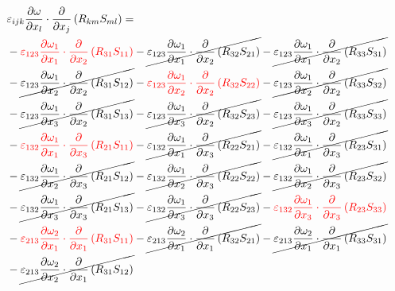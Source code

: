 \begin{equation}
	\begin{split}
		 & \varepsilon_{ijk}\pdv{\omega}{x_{l}} \cdot\pdv{}{x_{j}}\left(R_{km}S_{ml}\right) =  \\ 
		&-{\color{red}\varepsilon_{123}\pdv{\omega_{1}}{x_{1}}\cdot\pdv{}{x_{2}}\left(R_{31}S_{11}\right)
}		-\cancel{\varepsilon_{123}\pdv{\omega_{1}}{x_{1}}\cdot\pdv{}{x_{2}}\left(R_{32}S_{21}\right)
}		-\cancel{\varepsilon_{123}\pdv{\omega_{1}}{x_{1}}\cdot\pdv{}{x_{2}}\left(R_{33}S_{31}\right)
}\\ 
		&-\cancel{\varepsilon_{123}\pdv{\omega_{1}}{x_{2}}\cdot\pdv{}{x_{2}}\left(R_{31}S_{12}\right)
}		-{\color{red}\varepsilon_{123}\pdv{\omega_{1}}{x_{2}}\cdot\pdv{}{x_{2}}\left(R_{32}S_{22}\right)
}		-\cancel{\varepsilon_{123}\pdv{\omega_{1}}{x_{2}}\cdot\pdv{}{x_{2}}\left(R_{33}S_{32}\right)
}\\ 
		&-\cancel{\varepsilon_{123}\pdv{\omega_{1}}{x_{3}}\cdot\pdv{}{x_{2}}\left(R_{31}S_{13}\right)
}		-\cancel{\varepsilon_{123}\pdv{\omega_{1}}{x_{3}}\cdot\pdv{}{x_{2}}\left(R_{32}S_{23}\right)
}		-\cancel{\varepsilon_{123}\pdv{\omega_{1}}{x_{3}}\cdot\pdv{}{x_{2}}\left(R_{33}S_{33}\right)
}\\ 
		&-{\color{red}\varepsilon_{132}\pdv{\omega_{1}}{x_{1}}\cdot\pdv{}{x_{3}}\left(R_{21}S_{11}\right)
}		-\cancel{\varepsilon_{132}\pdv{\omega_{1}}{x_{1}}\cdot\pdv{}{x_{3}}\left(R_{22}S_{21}\right)
}		-\cancel{\varepsilon_{132}\pdv{\omega_{1}}{x_{1}}\cdot\pdv{}{x_{3}}\left(R_{23}S_{31}\right)
}\\ 
		&-\cancel{\varepsilon_{132}\pdv{\omega_{1}}{x_{2}}\cdot\pdv{}{x_{3}}\left(R_{21}S_{12}\right)
}		-\cancel{\varepsilon_{132}\pdv{\omega_{1}}{x_{2}}\cdot\pdv{}{x_{3}}\left(R_{22}S_{22}\right)
}		-\cancel{\varepsilon_{132}\pdv{\omega_{1}}{x_{2}}\cdot\pdv{}{x_{3}}\left(R_{23}S_{32}\right)
}\\ 
		&-\cancel{\varepsilon_{132}\pdv{\omega_{1}}{x_{3}}\cdot\pdv{}{x_{3}}\left(R_{21}S_{13}\right)
}		-\cancel{\varepsilon_{132}\pdv{\omega_{1}}{x_{3}}\cdot\pdv{}{x_{3}}\left(R_{22}S_{23}\right)
}		-{\color{red}\varepsilon_{132}\pdv{\omega_{1}}{x_{3}}\cdot\pdv{}{x_{3}}\left(R_{23}S_{33}\right)
}\\ 
		&-{\color{red}\varepsilon_{213}\pdv{\omega_{2}}{x_{1}}\cdot\pdv{}{x_{1}}\left(R_{31}S_{11}\right)
}		-\cancel{\varepsilon_{213}\pdv{\omega_{2}}{x_{1}}\cdot\pdv{}{x_{1}}\left(R_{32}S_{21}\right)
}		-\cancel{\varepsilon_{213}\pdv{\omega_{2}}{x_{1}}\cdot\pdv{}{x_{1}}\left(R_{33}S_{31}\right)
}\\ 
		&-\cancel{\varepsilon_{213}\pdv{\omega_{2}}{x_{2}}\cdot\pdv{}{x_{1}}\left(R_{31}S_{12}\right)
}
\end{split}
\end{equation}
